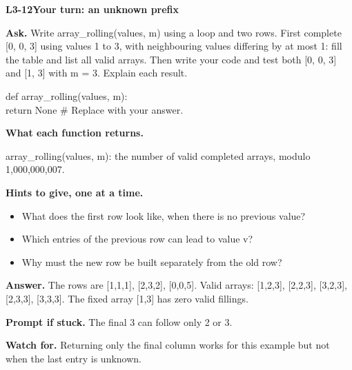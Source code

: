 \documentclass[11pt,a4paper]{article}
\begin{document}
\noindent\begin{minipage}{\textwidth}
{\color{teal}\textbf{L3-12}}\quad \textbf{Your turn: an unknown prefix}\par\smallskip
\textbf{Ask.} Write array\_rolling(values, m) using a loop and two rows. First complete [0, 0, 3] using values 1 to 3, with neighbouring values differing by at most 1: fill the table and list all valid arrays. Then write your code and test both [0, 0, 3] and [1, 3] with m = 3. Explain each result.\par\smallskip
\par{}\par\smallskip\noindent\colorbox{codepaper}{\parbox{\dimexpr\linewidth-2\fboxsep\relax}{\small\ttfamily\raggedright def array\_rolling(values, m):\\\hspace*{2.4em}return None  \# Replace with your answer.}}\par
{\small\textbf{What each function returns.}\par array\_rolling(values, m): the number of valid completed arrays, modulo 1,000,000,007.\par }
{\small\textbf{Hints to give, one at a time.}}\begin{itemize}\item What does the first row look like, when there is no previous value?\item Which entries of the previous row can lead to value v?\item Why must the new row be built separately from the old row?\end{itemize}
\textbf{Answer.} The rows are [1,1,1], [2,3,2], [0,0,5]. Valid arrays: [1,2,3], [2,2,3], [3,2,3], [2,3,3], [3,3,3]. The fixed array [1,3] has zero valid fillings.\par\smallskip
\textbf{Prompt if stuck.} The final 3 can follow only 2 or 3.\par\smallskip
\textbf{Watch for.} Returning only the final column works for this example but not when the last entry is unknown.
\end{minipage}\par{}\medskip
\end{document}
